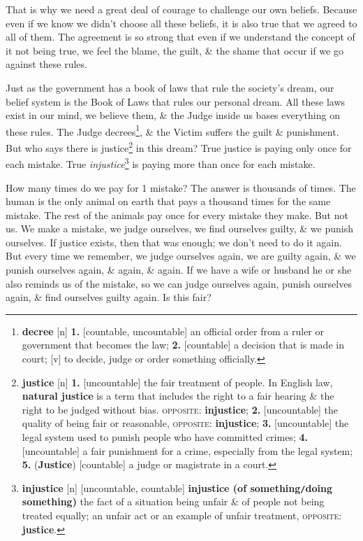 \documentclass[oneside]{book}
\numberwithin{equation}{section}
\begin{document}
That is why we need a great deal of courage to challenge our own beliefs. Because even if we know we didn't choose all these beliefs, it is also true that we agreed to all of them. The agreement is so strong that even if we understand the concept of it not being true, we feel the blame, the guilt, \& the shame that occur if we go against these rules.

Just as the government has a book of laws that rule the society's dream, our belief system is the Book of Laws that rules our personal dream. All these laws exist in our mind, we believe them, \& the Judge inside us bases everything on these rules. The Judge decrees\footnote{\textbf{decree} [n] \textbf{1.} [countable, uncountable] an official order from a ruler or government that becomes the law; \textbf{2.} [countable] a decision that is made in court; [v] to decide, judge or order something officially.}, \& the Victim suffers the guilt \& punishment. But who says there is justice\footnote{\textbf{justice} [n] \textbf{1.} [uncountable] the fair treatment of people. In English law, \textbf{natural justice} is a term that includes the right to a fair hearing \& the right to be judged without bias. \textsc{opposite}: \textbf{injustice}; \textbf{2.} [uncountable] the quality of being fair or reasonable, \textsc{opposite}: \textbf{injustice}; \textbf{3.} [uncountable] the legal system used to punish people who have committed crimes; \textbf{4.} [uncountable] a fair punishment for a crime, especially from the legal system; \textbf{5.} (\textbf{Justice}) [countable] a judge or magistrate in a court.} in this dream? True justice is paying only once for each mistake. True \textit{injustice}\footnote{\textbf{injustice} [n] [uncountable, countable] \textbf{injustice (of something\texttt{/}doing something)} the fact of a situation being unfair \& of people not being treated equally; an unfair act or an example of unfair treatment, \textsc{opposite}: \textbf{justice}.} is paying more than once for each mistake.

How many times do we pay for 1 mistake? The answer is thousands of times. The human is the only animal on earth that pays a thousand times for the same mistake. The rest of the animals pay once for every mistake they make. But not us.  We make a mistake, we judge ourselves, we find ourselves guilty, \& we punish ourselves. If justice exists, then that was enough; we don't need to do it again. But every time we remember, we judge ourselves again, we are guilty again, \& we punish ourselves again, \& again, \& again. If we have a wife or husband he or she also reminds us of the mistake, so we can judge ourselves again, punish ourselves again, \& find ourselves guilty again. Is this fair?
\end{document}
